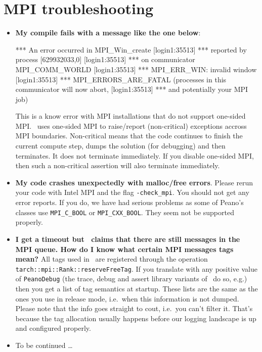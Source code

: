 \section{MPI troubleshooting}
\begin{itemize}
  \item \textbf{My compile fails with a message like the one below}:
  \begin{code}
[login1:35513] *** An error occurred in MPI_Win_create
[login1:35513] *** reported by process [629932033,0]
[login1:35513] *** on communicator MPI_COMM_WORLD
[login1:35513] *** MPI_ERR_WIN: invalid window
[login1:35513] *** MPI_ERRORS_ARE_FATAL (processes in this communicator will now abort,
[login1:35513] ***    and potentially your MPI job)  
  \end{code}
  This is a know error with MPI installations that do not support one-sided MPI. 
  \Peano\ uses one-sided MPI to raise/report (non-critical) exceptions accross MPI boundaries.
  Non-critical means that the code continues to finish the current compute step,
  dumps the solution (for debugging) and then terminates. It does not terminate
  immediately. If you disable one-sided MPI, then such a non-critical assertion
  will also terminate immediately.
  \item \textbf{My code crashes unexpectedly with malloc/free errors}. Please
  rerun your code with Intel MPI and the flag \texttt{-check\_mpi}. You should
  not get any error reports. If you do, we have had serious problems as some of
  Peano's classes use \texttt{MPI\_C\_BOOL} or \texttt{MPI\_CXX\_BOOL}. They
  seem not be supported properly.
  \item \textbf{I get a timeout but \Peano\ claims that there are still
  messages in the MPI queue. How do I know what certain MPI messages tags
  mean?} All tags used in \Peano\ are registered through the operation \linebreak 
  \texttt{tarch::mpi::Rank::reserveFreeTag}. If you translate with any positive
  value of \texttt{PeanoDebug} (the trace, debug and assert library variants of
  \Peano\ do so, e.g.) then you get a list of tag semantics at startup. These
  lists are the same as the ones you use in release mode, i.e.~when this
  information is not dumped. Please note that the info goes straight to cout,
  i.e.~you can't filter it. That's because the tag allocation usually happens
  before our logging landscape is up and configured properly.
  \item To be continued \dots
\end{itemize}




